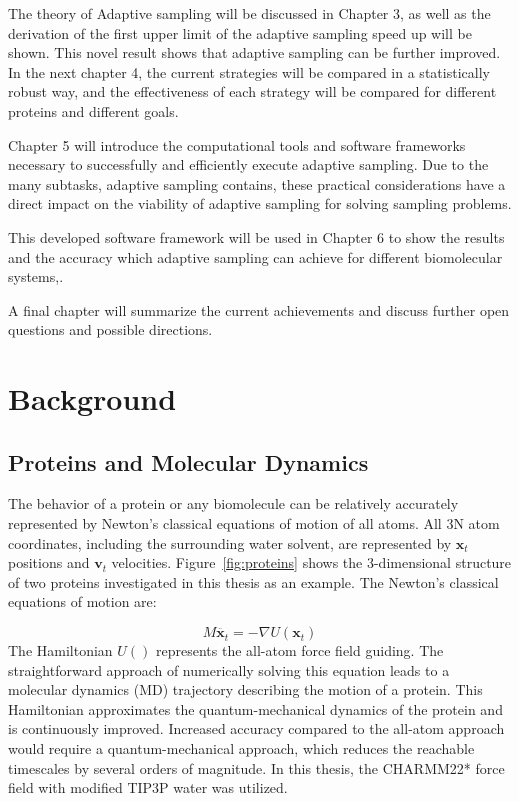 The theory of Adaptive sampling will be discussed in Chapter 3, as well as the derivation of the first upper limit of the adaptive sampling speed up will be shown. This novel result shows that adaptive sampling can be further improved. 
In the next chapter 4, the current strategies will be compared in a statistically robust way, and the effectiveness of each strategy will be compared for different proteins and different goals.

Chapter 5 will introduce the computational tools and software frameworks necessary to successfully and efficiently execute adaptive sampling. Due to the many subtasks, adaptive sampling contains, these practical considerations have a direct impact on the viability of adaptive sampling for solving sampling problems.

This developed software framework will be used in Chapter 6 to show the results and the accuracy which adaptive sampling can achieve for different biomolecular systems,. 

A final chapter will summarize the current achievements and discuss further open questions and possible directions.




\afterpage{\null\newpage}
\chapter{Background\label{sec:background}}

\section{Proteins and Molecular Dynamics}

The behavior of a protein or any biomolecule can be relatively accurately represented by Newton's classical equations of motion of all atoms. All 3N atom coordinates, including the surrounding water solvent, are represented by $\mathbf{x}_{t}$ positions and $\mathbf{v}_{t}$ velocities. Figure~\ref{fig:proteins} shows the 3-dimensional structure of two proteins investigated in this thesis as an example. The Newton's classical equations of motion are:

$$M\ddot{\mathbf{x}_{t}}=-\nabla U(\mathbf{x}_{t})$$
The Hamiltonian $U()$ represents the all-atom force field guiding. The straightforward approach of numerically solving this equation leads to a molecular dynamics (MD) trajectory describing the motion of a protein. This Hamiltonian approximates the quantum-mechanical dynamics of the protein and is continuously improved. Increased accuracy compared to the all-atom approach would require a quantum-mechanical approach, which reduces the reachable timescales by several orders of magnitude.  In this thesis, the CHARMM22* force field \cite{Charmm22star} with modified TIP3P water was utilized.

